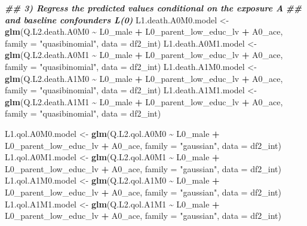 \documentclass[
]{book}
\newenvironment{Shaded}{\begin{snugshade}}{\end{snugshade}}
\newcommand{\AttributeTok}[1]{\textcolor[rgb]{0.13,0.29,0.53}{#1}}
\newcommand{\DocumentationTok}[1]{\textcolor[rgb]{0.56,0.35,0.01}{\textbf{\textit{#1}}}}
\newcommand{\FunctionTok}[1]{\textcolor[rgb]{0.13,0.29,0.53}{\textbf{#1}}}
\newcommand{\NormalTok}[1]{#1}
\newcommand{\OtherTok}[1]{\textcolor[rgb]{0.56,0.35,0.01}{#1}}
\newcommand{\SpecialCharTok}[1]{\textcolor[rgb]{0.81,0.36,0.00}{\textbf{#1}}}
\newcommand{\StringTok}[1]{\textcolor[rgb]{0.31,0.60,0.02}{#1}}
\begin{document}
\begin{Shaded}
\begin{Highlighting}[]
\DocumentationTok{\#\# 3) Regress the predicted values conditional on the exposure A}
\DocumentationTok{\#\#    and baseline confounders L(0)}
\NormalTok{L1.death.A0M0.model }\OtherTok{\textless{}{-}} \FunctionTok{glm}\NormalTok{(Q.L2.death.A0M0 }\SpecialCharTok{\textasciitilde{}}\NormalTok{ L0\_male }\SpecialCharTok{+}\NormalTok{ L0\_parent\_low\_educ\_lv }\SpecialCharTok{+}\NormalTok{ A0\_ace,}
                           \AttributeTok{family =} \StringTok{"quasibinomial"}\NormalTok{, }\AttributeTok{data =}\NormalTok{ df2\_int)}
\NormalTok{L1.death.A0M1.model }\OtherTok{\textless{}{-}} \FunctionTok{glm}\NormalTok{(Q.L2.death.A0M1 }\SpecialCharTok{\textasciitilde{}}\NormalTok{ L0\_male }\SpecialCharTok{+}\NormalTok{ L0\_parent\_low\_educ\_lv }\SpecialCharTok{+}\NormalTok{ A0\_ace,}
                           \AttributeTok{family =} \StringTok{"quasibinomial"}\NormalTok{, }\AttributeTok{data =}\NormalTok{ df2\_int)}
\NormalTok{L1.death.A1M0.model }\OtherTok{\textless{}{-}} \FunctionTok{glm}\NormalTok{(Q.L2.death.A1M0 }\SpecialCharTok{\textasciitilde{}}\NormalTok{ L0\_male }\SpecialCharTok{+}\NormalTok{ L0\_parent\_low\_educ\_lv }\SpecialCharTok{+}\NormalTok{ A0\_ace,}
                           \AttributeTok{family =} \StringTok{"quasibinomial"}\NormalTok{, }\AttributeTok{data =}\NormalTok{ df2\_int)}
\NormalTok{L1.death.A1M1.model }\OtherTok{\textless{}{-}} \FunctionTok{glm}\NormalTok{(Q.L2.death.A1M1 }\SpecialCharTok{\textasciitilde{}}\NormalTok{ L0\_male }\SpecialCharTok{+}\NormalTok{ L0\_parent\_low\_educ\_lv }\SpecialCharTok{+}\NormalTok{ A0\_ace,}
                           \AttributeTok{family =} \StringTok{"quasibinomial"}\NormalTok{, }\AttributeTok{data =}\NormalTok{ df2\_int)}

\NormalTok{L1.qol.A0M0.model }\OtherTok{\textless{}{-}} \FunctionTok{glm}\NormalTok{(Q.L2.qol.A0M0 }\SpecialCharTok{\textasciitilde{}}\NormalTok{ L0\_male }\SpecialCharTok{+}\NormalTok{ L0\_parent\_low\_educ\_lv }\SpecialCharTok{+}\NormalTok{ A0\_ace,}
                         \AttributeTok{family =} \StringTok{"gaussian"}\NormalTok{, }\AttributeTok{data =}\NormalTok{ df2\_int)}
\NormalTok{L1.qol.A0M1.model }\OtherTok{\textless{}{-}} \FunctionTok{glm}\NormalTok{(Q.L2.qol.A0M1 }\SpecialCharTok{\textasciitilde{}}\NormalTok{ L0\_male }\SpecialCharTok{+}\NormalTok{ L0\_parent\_low\_educ\_lv }\SpecialCharTok{+}\NormalTok{ A0\_ace,}
                         \AttributeTok{family =} \StringTok{"gaussian"}\NormalTok{, }\AttributeTok{data =}\NormalTok{ df2\_int)}
\NormalTok{L1.qol.A1M0.model }\OtherTok{\textless{}{-}} \FunctionTok{glm}\NormalTok{(Q.L2.qol.A1M0 }\SpecialCharTok{\textasciitilde{}}\NormalTok{ L0\_male }\SpecialCharTok{+}\NormalTok{ L0\_parent\_low\_educ\_lv }\SpecialCharTok{+}\NormalTok{ A0\_ace,}
                         \AttributeTok{family =} \StringTok{"gaussian"}\NormalTok{, }\AttributeTok{data =}\NormalTok{ df2\_int)}
\NormalTok{L1.qol.A1M1.model }\OtherTok{\textless{}{-}} \FunctionTok{glm}\NormalTok{(Q.L2.qol.A1M1 }\SpecialCharTok{\textasciitilde{}}\NormalTok{ L0\_male }\SpecialCharTok{+}\NormalTok{ L0\_parent\_low\_educ\_lv }\SpecialCharTok{+}\NormalTok{ A0\_ace,}
                         \AttributeTok{family =} \StringTok{"gaussian"}\NormalTok{, }\AttributeTok{data =}\NormalTok{ df2\_int)}


\end{Highlighting}
\end{Shaded}
\end{document}
